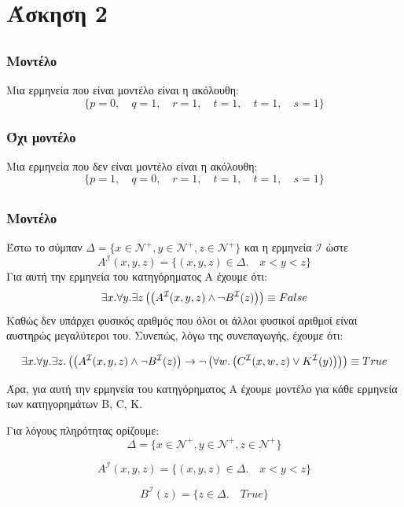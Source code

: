 \documentclass[a4paper,oneside, 11pt]{article}
\newcommand*{\im}{\ensuremath{\to}}
\newcommand*{\ex}{\ensuremath{\exists}}
\newcommand*{\f}{\ensuremath{\forall}}
\newcommand*{\p}{\ensuremath{\left(}}
\newcommand*{\pp}{\ensuremath{\right)}}
\newcommand*{\ww}{\ensuremath{\wedge}}
\newcommand*{\vv}{\ensuremath{\vee}}
\newcommand*{\eq}{\ensuremath{\equiv}}
\begin{document}
\section{Άσκηση 2}

\subsection{}
\subsubsection{Μοντέλο}
Μια ερμηνεία που είναι μοντέλο είναι η ακόλουθη:
$$\{p=0, \quad q=1, \quad r=1, \quad t=1, \quad t=1, \quad s=1\}$$


\subsubsection{Όχι μοντέλο}
Μια ερμηνεία που δεν είναι μοντέλο είναι η ακόλουθη:
$$
\{p=1, \quad q=0, \quad r=1, \quad t=1, \quad t=1, \quad s=1\}
$$

\subsection{}
\subsubsection{Μοντέλο}
Έστω το σύμπαν $\Delta = \{x\in \mathcal{N}^+,y\in \mathcal N^+,z \in \mathcal{N}^+ \}$ και η ερμηνεία $\mathcal I$ ώστε $$A^\mathcal I(x,y,z) = \{(x,y,z) \in \Delta . \quad  x < y < z\}$$
Για αυτή την ερμηνεία του κατηγόρηματος Α έχουμε ότι: 
$$\ex x. \f y. \ex z \p \p A^\mathcal I (x, y, z) \ww \neg B^\mathcal I(z)\pp \pp \eq False$$
Καθώς δεν υπάρχει φυσικός αριθμός που όλοι οι άλλοι φυσικοί αριθμοί είναι αυστηρώς μεγαλύτεροι του. Συνεπώς, λόγω της συνεπαγωγής, έχουμε ότι:

$$
\ex x. \f y. \ex z. \p \p A^\mathcal I(x,y,z) \ww \neg B^\mathcal I(z) \pp \im \neg \p \f w. \p C^\mathcal I(x, w, z) \vv K^\mathcal I(y) \pp \pp \pp \eq True
$$

Άρα, για αυτή την ερμηνεία του κατηγόρηματος Α έχουμε μοντέλο για κάθε ερμηνεία των κατηγορημάτων B, C, K. \bigbreak 

Για λόγους πληρότητας ορίζουμε:
$$\Delta = \{x\in \mathcal{N}^+,y\in \mathcal N^+,z \in \mathcal{N}^+ \}$$

$$A^\mathcal I(x,y,z) = \{(x,y,z) \in \Delta .  \quad x < y < z\}$$

$$
B ^ \mathcal I(z) = \{ z \in \Delta. \quad True\}
$$
\end{document}
